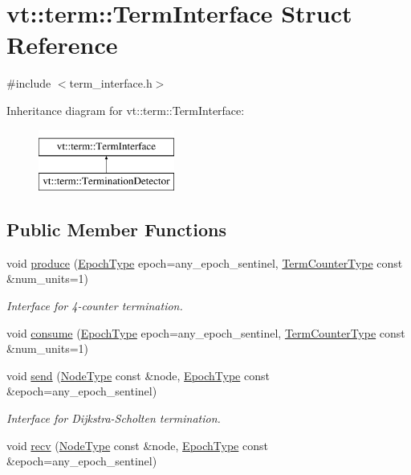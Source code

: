 \hypertarget{structvt_1_1term_1_1_term_interface}{}\section{vt\+:\+:term\+:\+:Term\+Interface Struct Reference}
\label{structvt_1_1term_1_1_term_interface}


{\ttfamily \#include $<$term\+\_\+interface.\+h$>$}

Inheritance diagram for vt\+:\+:term\+:\+:Term\+Interface\+:\begin{figure}[H]
\begin{center}
\leavevmode
\includegraphics[height=2.000000cm]{structvt_1_1term_1_1_term_interface}
\end{center}
\end{figure}
\subsection*{Public Member Functions}
\begin{DoxyCompactItemize}
\item 
void \hyperlink{structvt_1_1term_1_1_term_interface_a38661883a7d3a721e50c6ab2d9e10edb}{produce} (\hyperlink{namespacevt_a81d11b28122d43bf9834577e4a06440f}{Epoch\+Type} epoch=any\+\_\+epoch\+\_\+sentinel, \hyperlink{namespacevt_1_1term_a4fd378cdb0c36683afc1b3399d685f7f}{Term\+Counter\+Type} const \&num\+\_\+units=1)
\begin{DoxyCompactList}\small\item\em Interface for 4-\/counter termination. \end{DoxyCompactList}\item 
void \hyperlink{structvt_1_1term_1_1_term_interface_a6e117a0857540c82133b7a10bfa5d39e}{consume} (\hyperlink{namespacevt_a81d11b28122d43bf9834577e4a06440f}{Epoch\+Type} epoch=any\+\_\+epoch\+\_\+sentinel, \hyperlink{namespacevt_1_1term_a4fd378cdb0c36683afc1b3399d685f7f}{Term\+Counter\+Type} const \&num\+\_\+units=1)
\item 
void \hyperlink{structvt_1_1term_1_1_term_interface_a21ef75badf08fea19807204e502ec4fe}{send} (\hyperlink{namespacevt_a866da9d0efc19c0a1ce79e9e492f47e2}{Node\+Type} const \&node, \hyperlink{namespacevt_a81d11b28122d43bf9834577e4a06440f}{Epoch\+Type} const \&epoch=any\+\_\+epoch\+\_\+sentinel)
\begin{DoxyCompactList}\small\item\em Interface for Dijkstra-\/\+Scholten termination. \end{DoxyCompactList}\item 
void \hyperlink{structvt_1_1term_1_1_term_interface_afffcd1367305830597216a7b48886cb1}{recv} (\hyperlink{namespacevt_a866da9d0efc19c0a1ce79e9e492f47e2}{Node\+Type} const \&node, \hyperlink{namespacevt_a81d11b28122d43bf9834577e4a06440f}{Epoch\+Type} const \&epoch=any\+\_\+epoch\+\_\+sentinel)
\end{DoxyCompactItemize}



